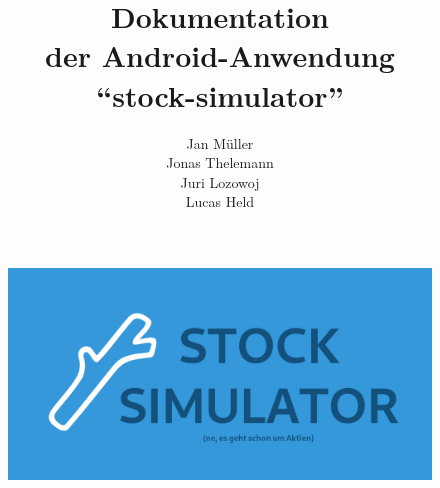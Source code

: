 \documentclass[a4paper]{article}
\begin{document}
\title{\textbf{Dokumentation\\der Android-Anwendung\\"`stock-simulator"'}}

\author{
    Jan Müller\\
    Jonas Thelemann\\
    Juri Lozowoj\\
    Lucas Held
}
\maketitle

\begin{figure}[H]
    \centering
    \includegraphics[width=\textwidth,keepaspectratio]{./images/stock-simulator-social_sub.png}
\end{figure}

\pagebreak
\tableofcontents
\pagebreak
\end{document}
